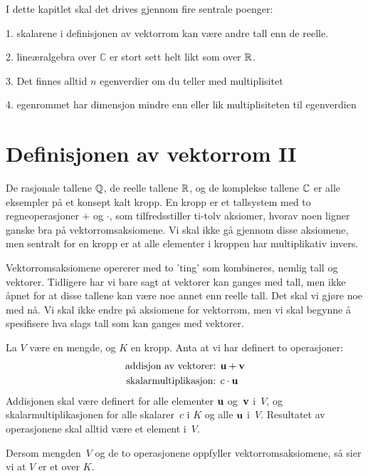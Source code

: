 

\label{ch:kompleks-linear-algebra}

I dette kapitlet skal det drives gjennom fire sentrale poenger: 

1. skalarene i definisjonen av vektorrom kan være andre tall enn de reelle.

2. lineæralgebra over $\mathbb C$ er stort sett helt likt som over $\mathbb{R}$.

3. Det finnes alltid $n$ egenverdier om du teller med multiplisitet
 
4. egenrommet har dimensjon mindre enn eller lik multiplisiteten til egenverdien

\section*{Definisjonen av vektorrom II}

De rasjonale tallene $\mathbb{Q}$, de reelle tallene $\mathbb{R}$, 
og de komplekse tallene $\mathbb{C}$ er alle eksempler på et konsept kalt kropp. 
En kropp er et tallsystem med to regneoperasjoner $+$ og $\cdot$, 
som tilfredsstiller ti-tolv aksiomer, 
hvorav noen ligner ganske bra på vektorromsaksiomene. 
Vi skal ikke gå gjennom disse aksiomene, 
men sentralt for en kropp er at alle elementer i kroppen har multiplikativ invers.

Vektorromsaksiomene opererer med to 'ting' som kombineres, nemlig tall og vektorer. 
Tidligere har vi bare sagt at vektorer kan ganges med tall, 
men ikke åpnet for at disse tallene kan være noe annet enn reelle tall. 
Det skal vi gjøre noe med nå. 
Vi skal ikke endre på aksiomene for vektorrom, 
men vi skal begynne å spesifisere hva slags tall som kan ganges med vektorer. 

\begin{defn}
La $V$ være en mengde, og $K$ en kropp. Anta at vi har definert to operasjoner:
\begin{align*}
\text{addisjon av vektorer: } & \mathbf{u} + \mathbf{v} \\
\text{skalarmultiplikasjon: } & c \cdot \mathbf{u}
\end{align*}
Addisjonen skal være definert for alle elementer $\mathbf{u}$ og~$\mathbf{v}$
i~$V$, og skalarmultiplikasjonen for alle skalarer~$c$ i $K$ og alle $\mathbf{u}$
i~$V$.  Resultatet av operasjonene skal alltid være et element i~$V$.

Dersom mengden~$V$ og de to operasjonene oppfyller vektorromsaksiomene, 
så sier vi at $V$ er et  over $K$.
\end{defn}

